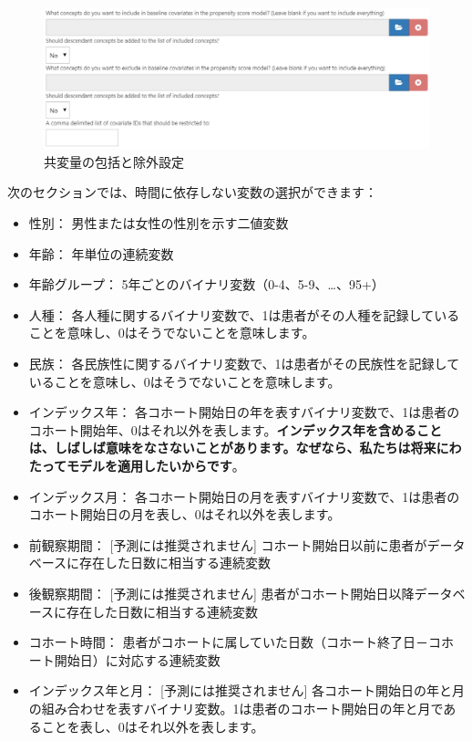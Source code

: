 \documentclass[
  11pt]{book}
\theoremstyle{definition}
\theoremstyle{definition}
\theoremstyle{definition}
\theoremstyle{definition}
\theoremstyle{remark}
\begin{document}
\begin{figure}

{\centering \includegraphics[width=1\linewidth]{images/PatientLevelPrediction/covariateSettings1} 

}

\caption{共変量の包括と除外設定}\label{fig:covariateSettings1}
\end{figure}

次のセクションでは、時間に依存しない変数の選択ができます：

\begin{itemize}
\item
  性別： 男性または女性の性別を示す二値変数
\item
  年齢： 年単位の連続変数
\item
  年齢グループ： 5年ごとのバイナリ変数（0-4、5-9、\ldots、95+）
\item
  人種： 各人種に関するバイナリ変数で、1は患者がその人種を記録していることを意味し、0はそうでないことを意味します。
\item
  民族： 各民族性に関するバイナリ変数で、1は患者がその民族性を記録していることを意味し、0はそうでないことを意味します。
\item
  インデックス年： 各コホート開始日の年を表すバイナリ変数で、1は患者のコホート開始年、0はそれ以外を表します。\textbf{インデックス年を含めることは、しばしば意味をなさないことがあります。なぜなら、私たちは将来にわたってモデルを適用したいからです}。
\item
  インデックス月： 各コホート開始日の月を表すバイナリ変数で、1は患者のコホート開始日の月を表し、0はそれ以外を表します。
\item
  前観察期間： {[}予測には推奨されません{]} コホート開始日以前に患者がデータベースに存在した日数に相当する連続変数
\item
  後観察期間： {[}予測には推奨されません{]} 患者がコホート開始日以降データベースに存在した日数に相当する連続変数
\item
  コホート時間： 患者がコホートに属していた日数（コホート終了日－コホート開始日）に対応する連続変数
\item
  インデックス年と月： {[}予測には推奨されません{]} 各コホート開始日の年と月の組み合わせを表すバイナリ変数。1は患者のコホート開始日の年と月であることを表し、0はそれ以外を表します。
\end{itemize}
\end{document}
